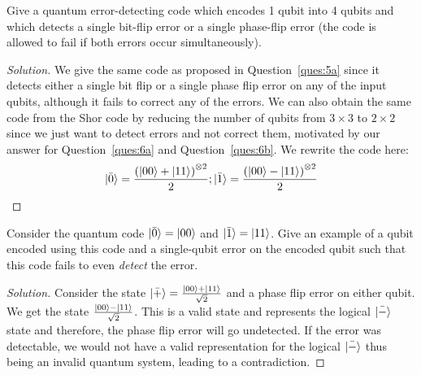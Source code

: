 \begin{solution}[label=ques:6d]
  \begin{question}
    Give a quantum error-detecting code which encodes 1 qubit into
4 qubits and which detects a single bit-flip error or a single
phase-flip error (the code is allowed to fail if both errors occur simultaneously).
  \end{question}
  \tcblower{}
  \begin{proof}[Solution]
    We give the same code as proposed in Question~\ref{ques:5a} since it detects either a single bit flip or a single phase flip error on any of the input qubits, although it fails to correct any of the errors. We can also obtain the same code from the Shor code by reducing the number of qubits from $3\times 3$ to $2\times 2$ since we just want to detect errors and not correct them, motivated by our answer for Question~\ref{ques:6a} and Question~\ref{ques:6b}. We rewrite the code here:
    \begin{equation}
      \ket{\bar 0} = \frac{{\left(\ket{00}+ \ket{11}\right)}^{\otimes 2} }{ 2}; \ket{\bar 1} = \frac{{\left(\ket{00}- \ket{11}\right)}^{\otimes 2} }{ 2}
      \label{eq:shordetect}
    \end{equation}
  \end{proof}
\end{solution}

\begin{solution}[label=ques:6e]
  \begin{question}
    Consider the quantum code  $\ket{\bar 0} = \ket{00}$ and $\ket{\bar 1} = \ket{11}$.  Give an
example of a qubit encoded using this code and a single-qubit
error on the encoded qubit such that this code fails to even \textit{detect} the error.
  \end{question}
  \tcblower{}
  \begin{proof}[Solution]
    Consider the state $\ket{\bar{+}} = \frac{\ket{00} + \ket{11}}{\sqrt{2}}$ and a phase flip error on either qubit. We get the state $\frac{\ket{00} - \ket{11}}{\sqrt{2}}$. This is a valid state and represents the logical $\ket{\bar{-}}$ state and therefore, the phase flip error will go undetected. If the error was detectable, we would not have a valid representation for the logical $\ket{\bar{-}}$ thus being an invalid quantum system, leading to a contradiction.
  \end{proof}
\end{solution}
